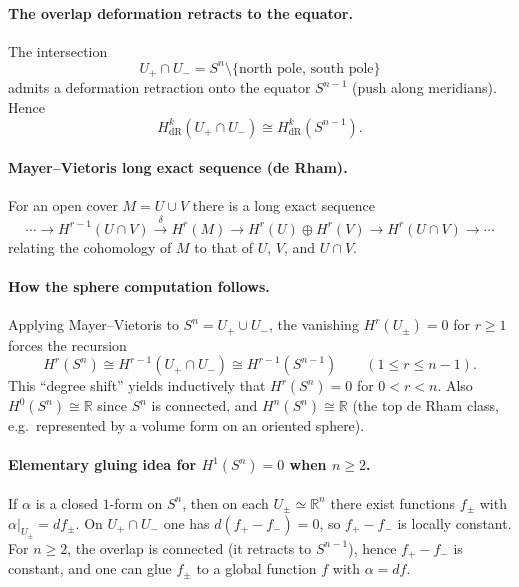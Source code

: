\documentclass[12pt,a4paper]{article}
\theoremstyle{plain}
\theoremstyle{definition}      %
\begin{document}
\paragraph{The overlap deformation retracts to the equator.}
The intersection
\[
U_+\cap U_- = S^n\setminus\{\text{north pole, south pole}\}
\]
admits a deformation retraction onto the equator $S^{n-1}$ (push along meridians).
Hence
\[
H^k_{\mathrm{dR}}(U_+\cap U_-)\cong H^k_{\mathrm{dR}}(S^{n-1}).
\]

\paragraph{Mayer--Vietoris long exact sequence (de Rham).}
For an open cover $M=U\cup V$ there is a long exact sequence
\[
\cdots \to H^{r-1}(U\cap V)\xrightarrow{\delta} H^r(M)
\to H^r(U)\oplus H^r(V)\to H^r(U\cap V)\to \cdots
\]
relating the cohomology of $M$ to that of $U$, $V$, and $U\cap V$.

\paragraph{How the sphere computation follows.}
Applying Mayer--Vietoris to $S^n=U_+\cup U_-$, the vanishing $H^r(U_\pm)=0$ for $r\ge 1$
forces the recursion
\[
H^r(S^n)\cong H^{r-1}(U_+\cap U_-)\cong H^{r-1}(S^{n-1})
\qquad (1\le r\le n-1).
\]
This ``degree shift'' yields inductively that $H^r(S^n)=0$ for $0<r<n$.
Also $H^0(S^n)\cong\mathbb{R}$ since $S^n$ is connected, and $H^n(S^n)\cong\mathbb{R}$
(the top de Rham class, e.g.\ represented by a volume form on an oriented sphere).

\paragraph{Elementary gluing idea for $H^1(S^n)=0$ when $n\ge 2$.}
If $\alpha$ is a closed $1$-form on $S^n$, then on each $U_\pm\simeq\mathbb{R}^n$ there exist
functions $f_\pm$ with $\alpha|_{U_\pm}=df_\pm$.
On $U_+\cap U_-$ one has $d(f_+-f_-)=0$, so $f_+-f_-$ is locally constant.
For $n\ge 2$, the overlap is connected (it retracts to $S^{n-1}$), hence $f_+-f_-$ is constant,
and one can glue $f_\pm$ to a global function $f$ with $\alpha=df$.
\end{document}
